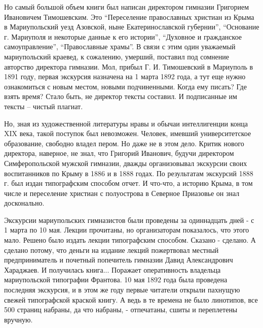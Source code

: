 
Но самый большой объем книги был написан директором гимназии Григорием
Ивановичем Тимошевским. Это \enquote{Переселение православных христиан из Крыма в
Мариупольский уезд Азовской, ныне Екатеринославской губернии}, \enquote{Основание г.
Мариуполя и некоторые данные к его истории}, \enquote{Духовное и гражданское
самоуправление}, \enquote{Православные храмы}. В связи с этим один уважаемый
мариупольский краевед, к сожалению, умерший, поставил под сомнение авторство
директора гимназии. Мол, прибыл Г. И. Тимошевский в Мариуполь в 1891 году,
первая экскурсия назначена на 1 марта 1892 года, а тут еще нужно ознакомиться с
новым местом, новыми подчиненными. Когда ему писать? Где взять время? Стало
быть, не директор тексты составил. И подписанные им тексты – чистый плагиат.


Но, зная из художественной литературы нравы и обычаи интеллигенции конца XIX
века, такой поступок был невозможен. Человек, имевший университетское
образование, свободно владел пером. Но даже не в этом дело. Критик нового
директора, наверное, не знал, что Григорий Иванович, будучи директором
Симферопольской мужской гимназии, дважды организовывал экскурсии своих
воспитанников по Крыму в 1886 и в 1888 годах. По результатам экскурсий 1888 г.
был издан типографским способом отчет. И что-что, а историю Крыма, в том числе
и переселение христиан с полуострова в Северное Приазовье он знал досконально.

Экскурсии мариупольских гимназистов были проведены за одиннадцать дней - с 1
марта по 10 мая. Лекции прочитаны, но организаторам показалось, что этого мало.
Решено было издать лекции типографским способом. Сказано - сделано. А сделано
потому, что деньги на издание лекций пожертвовал местный предприниматель и
почетный попечитель гимназии Давид Александрович Хараджаев. И получилась
книга... Поражает оперативность владельца мариупольской типографии Франтова. 10
мая 1892 года была проведена последняя экскурсия, и в этом же году первые
читатели открыли пахнущую свежей типографской краской книгу. А ведь в те
времена не было линотипов, все 500 страниц набраны, да что набраны, -
отпечатаны, сшиты и переплетены вручную.


